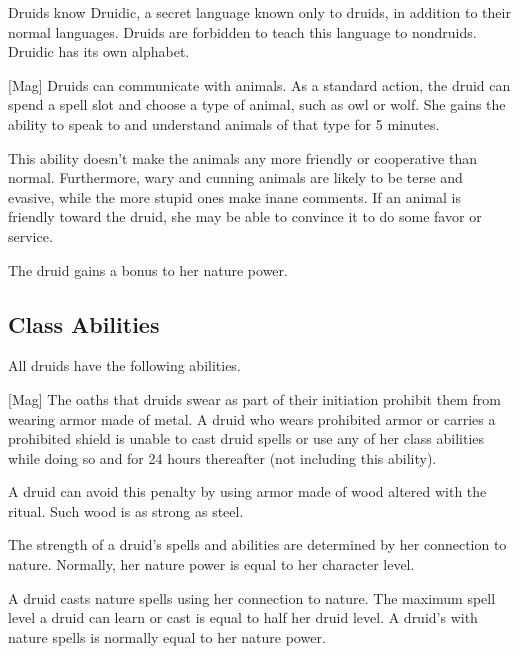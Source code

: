         Druids know Druidic, a secret language known only to druids, in addition to their normal languages.
        Druids are forbidden to teach this language to nondruids.
        Druidic has its own alphabet.

        [Mag]
        Druids can communicate with animals.
        As a standard action, the druid can spend a spell slot and choose a type of animal, such as owl or wolf.
        She gains the ability to speak to and understand animals of that type for 5 minutes.

        This ability doesn't make the animals any more friendly or cooperative than normal.
        Furthermore, wary and cunning animals are likely to be terse and evasive, while the more stupid ones make inane comments.
        If an animal is friendly toward the druid, she may be able to convince it to do some favor or service.

        The druid gains a  bonus to her nature power.

    \subsection{Class Abilities}
        All druids have the following abilities.

        [Mag]
        The oaths that druids swear as part of their initiation prohibit them from wearing armor made of metal.
        A druid who wears prohibited armor or carries a prohibited shield is unable to cast druid spells or use any of her  class abilities while doing so and for 24 hours thereafter (not including this ability).
        
        A druid can avoid this penalty by using armor made of wood altered with the  ritual.
        Such wood is as strong as steel.

        The strength of a druid's spells and abilities are determined by her connection to nature.
        Normally, her nature power is equal to her character level.

        A druid casts nature spells using her connection to nature.
        The maximum spell level a druid can learn or cast is equal to half her druid level.
        A druid's  with nature spells is normally equal to her nature power.

